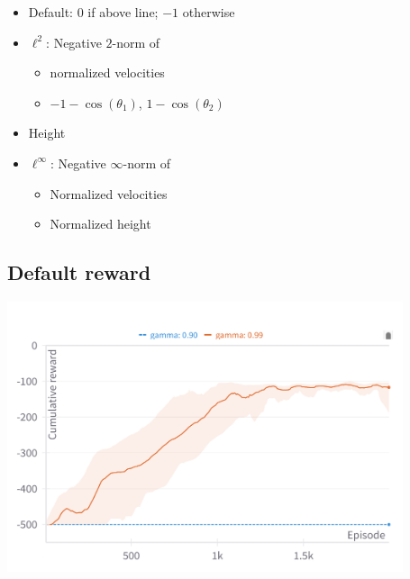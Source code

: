 \documentclass[
  letterpaper,
  DIV=11,
  numbers=noendperiod,
  oneside]{scrartcl}
\providecommand{\tightlist}{%
  \setlength{\itemsep}{0pt}\setlength{\parskip}{0pt}}\usepackage{longtable,booktabs,array}
\begin{document}
\begin{itemize}
\tightlist
\item
  Default: \(0\) if above line; \(-1\) otherwise
\item
  \(\ell^2\): Negative \(2\)-norm of

  \begin{itemize}
  \tightlist
  \item
    normalized velocities
  \item
    \(-1 - \cos( \theta_1 )\), \(1 - \cos( \theta_2 )\)
  \end{itemize}
\item
  Height
\item
  \(\ell^\infty\): Negative \(\infty\)-norm of

  \begin{itemize}
  \tightlist
  \item
    Normalized velocities
  \item
    Normalized height
  \end{itemize}
\end{itemize}

\subsection{Default reward}\label{default-reward}

\begin{center}
\includegraphics[width=\textwidth,height=3.125in]{figs/reward_default.png}
\end{center}

\end{document}
